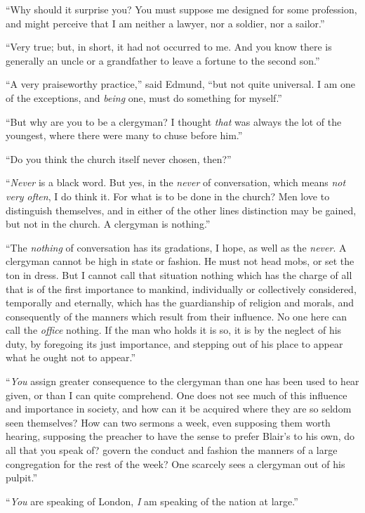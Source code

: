 ``Why should it surprise you?  You must suppose me designed
for some profession, and might perceive that I am neither
a lawyer, nor a soldier, nor a sailor.''

``Very true; but, in short, it had not occurred to me.
And you know there is generally an uncle or a grandfather
to leave a fortune to the second son.''

``A very praiseworthy practice,'' said Edmund,
``but not quite universal.  I am one of the exceptions,
and \emph{being} one, must do something for myself.''

``But why are you to be a clergyman?  I thought \emph{that}
was always the lot of the youngest, where there were
many to chuse before him.''

``Do you think the church itself never chosen, then?''

``\emph{Never} is a black word.  But yes, in the \emph{never}
of conversation, which means \emph{not} \emph{very} \emph{often},
I do think it.  For what is to be done in the church?
Men love to distinguish themselves, and in either of the other
lines distinction may be gained, but not in the church.
A clergyman is nothing.''

``The \emph{nothing} of conversation has its gradations, I hope,
as well as the \emph{never}.  A clergyman cannot be high in
state or fashion.  He must not head mobs, or set the ton
in dress.  But I cannot call that situation nothing which
has the charge of all that is of the first importance
to mankind, individually or collectively considered,
temporally and eternally, which has the guardianship
of religion and morals, and consequently of the manners
which result from their influence.  No one here can call
the \emph{office} nothing.  If the man who holds it is so,
it is by the neglect of his duty, by foregoing its
just importance, and stepping out of his place to appear
what he ought not to appear.''

``\emph{You} assign greater consequence to the clergyman than one
has been used to hear given, or than I can quite comprehend.
One does not see much of this influence and importance
in society, and how can it be acquired where they are
so seldom seen themselves?  How can two sermons a week,
even supposing them worth hearing, supposing the preacher
to have the sense to prefer Blair's to his own, do all
that you speak of? govern the conduct and fashion the
manners of a large congregation for the rest of the week?
One scarcely sees a clergyman out of his pulpit.''

``\emph{You} are speaking of London, \emph{I} am speaking of the
nation at large.''

